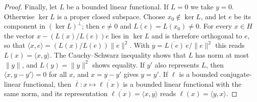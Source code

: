 \begin{proof}
Finally, let $L$ be a bounded linear functional. If $L=0$ we take $y=0$. Otherwise $\ker L$ is a proper closed subspace. Choose $x_0\notin\ker L$, and let $e$ be its component in $(\ker L)^\perp$; then $e\ne0$ and $L(e)=L(x_0)\ne0$. For every $x\in H$ the vector $x-(L(x)/L(e))e$ lies in $\ker L$ and is therefore orthogonal to $e$, so that $\langle x,e\rangle=(L(x)/L(e))\|e\|^2$. With $y=\overline{L(e)}\,e/\|e\|^2$ this reads $L(x)=\langle x,y\rangle$. The Cauchy--Schwarz inequality shows that $L$ has norm at most $\|y\|$, and $L(y)=\|y\|^2$ shows equality. If $y'$ also represents $L$, then $\langle x,y-y'\rangle=0$ for all $x$, and $x=y-y'$ gives $y=y'$. If $\ell$ is a bounded conjugate-linear functional, then $\overline\ell\colon x\mapsto\overline{\ell(x)}$ is a bounded linear functional with the same norm, and its representation $\overline{\ell(x)}=\langle x,y\rangle$ reads $\ell(x)=\langle y,x\rangle$.
\end{proof}


